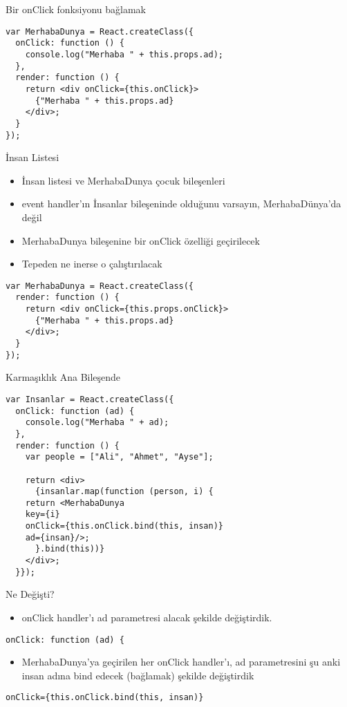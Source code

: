 \documentclass[presentation]{beamer}
\begin{document}
\begin{frame}[fragile,label={sec:orgdcef380}]{Bir onClick fonksiyonu bağlamak}
 \begin{verbatim}
var MerhabaDunya = React.createClass({
  onClick: function () {
    console.log("Merhaba " + this.props.ad);
  },
  render: function () {
    return <div onClick={this.onClick}>
      {"Merhaba " + this.props.ad}
    </div>;
  }
});
\end{verbatim}
\end{frame}

\begin{frame}[fragile,label={sec:orgfa318ae}]{İnsan Listesi}
 \begin{itemize}
\item İnsan listesi ve MerhabaDunya çocuk bileşenleri
\item event handler'ın İnsanlar bileşeninde olduğunu varsayın, MerhabaDünya'da değil
\item MerhabaDunya bileşenine bir onClick özelliği geçirilecek
\item Tepeden ne inerse o çalıştırılacak
\end{itemize}

\begin{verbatim}
var MerhabaDunya = React.createClass({
  render: function () {
    return <div onClick={this.props.onClick}>
      {"Merhaba " + this.props.ad}
    </div>;
  }
});
\end{verbatim}
\end{frame}

\begin{frame}[fragile,label={sec:orga816a1d}]{Karmaşıklık Ana Bileşende}
 \begin{verbatim}
var Insanlar = React.createClass({
  onClick: function (ad) {
    console.log("Merhaba " + ad);
  },
  render: function () {
    var people = ["Ali", "Ahmet", "Ayse"];

    return <div>
      {insanlar.map(function (person, i) {
	return <MerhabaDunya
	key={i}
	onClick={this.onClick.bind(this, insan)}
	ad={insan}/>;
      }.bind(this))}
    </div>;
  }});
\end{verbatim}
\end{frame}

\begin{frame}[fragile,label={sec:org3af3252}]{Ne Değişti?}
 \begin{itemize}
\item onClick handler'ı ad parametresi alacak şekilde değiştirdik.
\end{itemize}
\begin{verbatim}
onClick: function (ad) {
\end{verbatim}

\begin{itemize}
\item MerhabaDunya'ya geçirilen her onClick handler'ı, ad parametresini şu anki
insan adına bind edecek (bağlamak) şekilde değiştirdik
\end{itemize}
\begin{verbatim}
onClick={this.onClick.bind(this, insan)}
\end{verbatim}
\end{frame}
\end{document}
